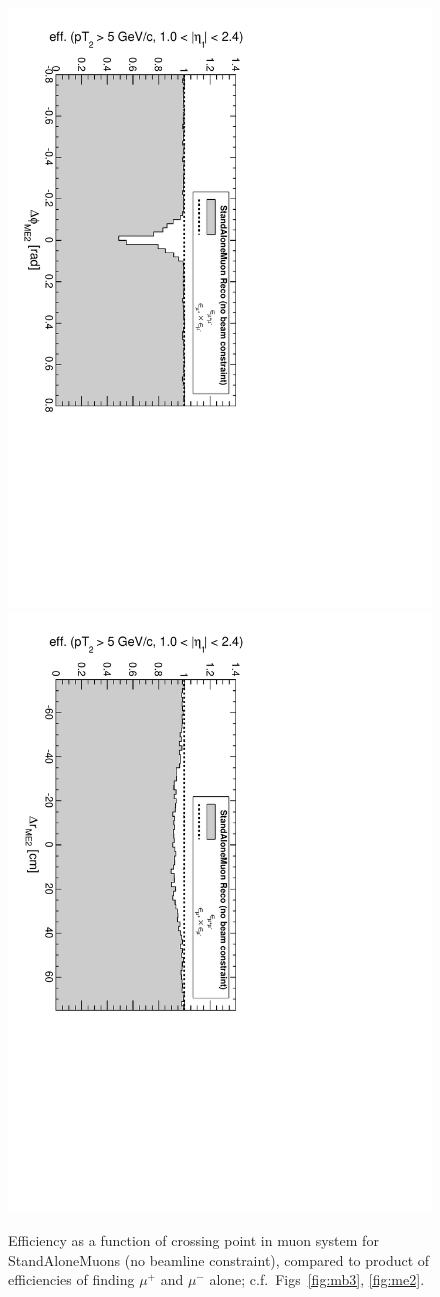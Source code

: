 \documentclass[12pt]{article}
\begin{document}
\begin{figure}[p]
\includegraphics[height=0.5\linewidth, angle=90]{fig/acceptance7_plot/vsme2dphi_StandAloneDefault.pdf}
\includegraphics[height=0.5\linewidth, angle=90]{fig/acceptance7_plot/vsme2dr_StandAloneDefault.pdf}

\caption{Efficiency as a function of crossing point in muon system for
  StandAloneMuons (no beamline constraint), compared to product of
  efficiencies of finding $\mu^+$ and $\mu^-$ alone;
  c.f.\ Figs~\ref{fig:mb3}, \ref{fig:me2}.}
\end{figure}
\end{document}
